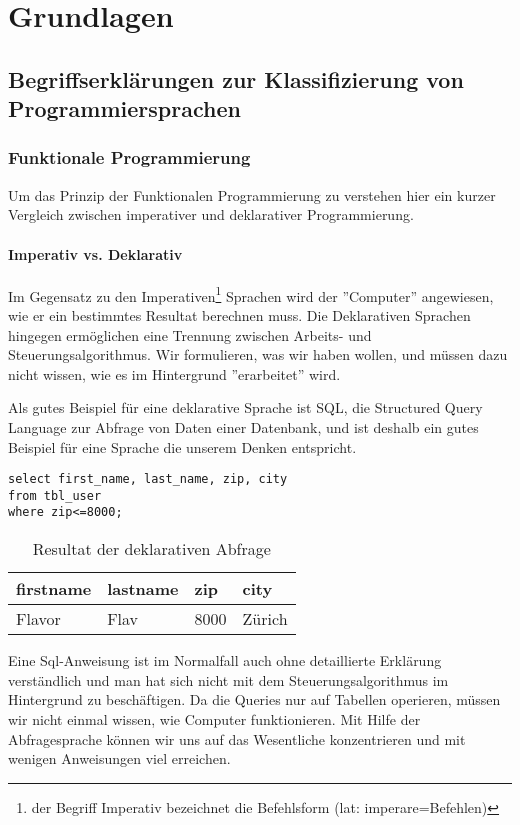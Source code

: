 \chapter{Grundlagen}

\section{Begriffserkl\"arungen zur Klassifizierung von Programmiersprachen}
 \subsection{Funktionale Programmierung}
Um das Prinzip der Funktionalen Programmierung zu verstehen hier ein kurzer Vergleich zwischen imperativer und deklarativer Programmierung.
\subsubsection{Imperativ vs. Deklarativ}
Im Gegensatz zu den Imperativen\footnote{der Begriff Imperativ bezeichnet die Befehlsform (lat: imperare=Befehlen)} Sprachen wird der ''Computer'' angewiesen, wie er ein bestimmtes Resultat berechnen muss. Die Deklarativen Sprachen hingegen erm\"oglichen eine Trennung zwischen Arbeits- und Steuerungsalgorithmus. Wir formulieren, was wir haben wollen, und m\"ussen dazu nicht wissen, wie es im Hintergrund ''erarbeitet'' wird.

Als gutes Beispiel f\"ur eine deklarative Sprache ist SQL, die Structured Query Language zur Abfrage von Daten einer Datenbank, und ist deshalb ein gutes Beispiel f\"ur eine Sprache die unserem Denken entspricht. 

\begin{lstlisting}[caption=Sql Deklaration]
select first_name, last_name, zip, city 
from tbl_user 
where zip<=8000;
\end{lstlisting}


  \begin{longtable}{|p{2cm}|p{2cm}|p{2cm}|p{2cm}|}
    \caption{Resultat der deklarativen Abfrage}\\
\hline
  firstname & lastname & zip & city\\
  \hline
    Flavor & Flav & 8000 & Z\"urich\\
  \hline
  \end{longtable}

Eine Sql-Anweisung ist im Normalfall auch ohne detaillierte Erkl\"arung verst\"andlich und man hat sich nicht mit dem Steuerungsalgorithmus im Hintergrund zu besch\"aftigen. Da die Queries nur auf Tabellen operieren, m\"ussen wir nicht einmal wissen, wie Computer funktionieren. Mit Hilfe der Abfragesprache k\"onnen wir uns auf das Wesentliche konzentrieren und mit wenigen Anweisungen viel erreichen. \cite{Piepmeyer201006}


